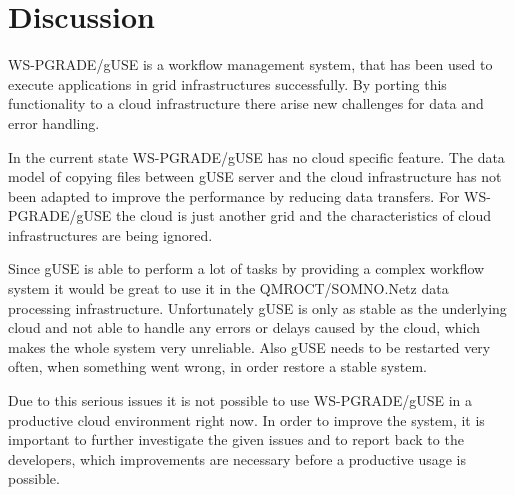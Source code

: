 \section{Discussion}\label{discussion}

WS-PGRADE/gUSE is a workflow management system, that has been used to execute applications in grid infrastructures successfully.
By porting this functionality to a cloud infrastructure there arise new challenges for data and error handling.

In the current state WS-PGRADE/gUSE has no cloud specific feature.
The data model of copying files between gUSE server and the cloud infrastructure has not been adapted to improve the performance by reducing data transfers.
For WS-PGRADE/gUSE the cloud is just another grid and the characteristics of cloud infrastructures are being ignored.

Since gUSE is able to perform a lot of tasks by providing a complex workflow system it would be great to use it in the QMROCT/SOMNO.Netz data processing infrastructure.
Unfortunately gUSE is only as stable as the underlying cloud and not able to handle any errors or delays caused by the cloud, which makes the whole system very unreliable.
Also gUSE needs to be restarted very often, when something went wrong, in order restore a stable system.

Due to this serious issues it is not possible to use WS-PGRADE/gUSE in a productive cloud environment right now.
In order to improve the system, it is important to further investigate the given issues and to report back to the developers, which improvements are necessary before a productive usage is possible.